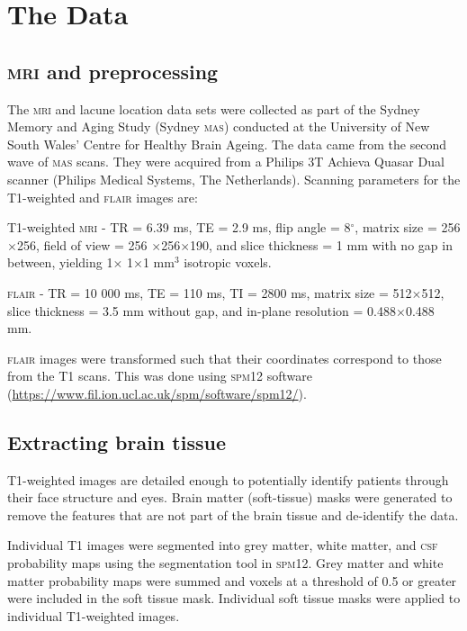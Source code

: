 


\chapter{The Data}\label{model}

\section{\textsc{mri} and preprocessing}\label{data-mri}

The \textsc{mri} and lacune location data sets were collected as part of the Sydney Memory and Aging Study (Sydney \textsc{mas}) conducted at the University of New South Wales' Centre for Healthy Brain Ageing. The data came from the second wave of \textsc{mas} scans. They were acquired from a Philips 3T Achieva Quasar Dual scanner (Philips Medical Systems, The Netherlands). Scanning parameters for the T1-weighted and \textsc{flair} images are:

T1-weighted \textsc{mri} - TR = 6.39 ms, TE = 2.9 ms, flip angle = 8$^\circ$, matrix size = 256$\times$256, field of view = 256 $\times$256$\times$190, and slice thickness = 1 mm with no gap in between, yielding 1$\times$ 1$\times$1 mm$^3$ isotropic voxels.

\textsc{flair} - TR = 10 000 ms, TE = 110 ms, TI = 2800 ms, matrix size = 512$\times$512, slice thickness = 3.5 mm without gap, and in-plane resolution = 0.488$\times$0.488 mm.

\textsc{flair} images were transformed such that their coordinates correspond to those from the T1 scans. This was done using \textsc{spm12} software (\url{https://www.fil.ion.ucl.ac.uk/spm/software/spm12/}).

\section{Extracting brain tissue}\label{data-soft}

T1-weighted images are detailed enough to potentially identify patients through their face structure and eyes. Brain matter (soft-tissue) masks were generated to remove the features that are not part of the brain tissue and de-identify the data.

Individual T1 images were segmented into grey matter, white matter, and \textsc{csf} probability maps using the segmentation tool in \textsc{spm12}. Grey matter and white matter probability maps were summed and voxels at a threshold of 0.5 or greater were included in the soft tissue mask. Individual soft tissue masks were applied to individual T1-weighted images.

